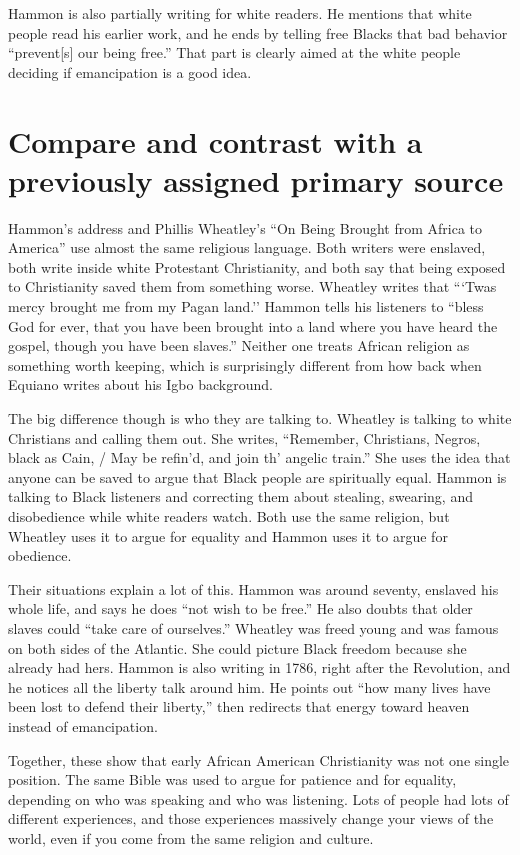 \documentclass[12pt]{article}
\begin{document}
Hammon is also partially writing for white readers. He mentions that white people read his earlier work, and he ends by telling free Blacks that bad behavior ``prevent[s] our being free.'' That part is clearly aimed at the white people deciding if emancipation is a good idea.

\section*{Compare and contrast with a previously assigned primary source}

Hammon's address and Phillis Wheatley's ``On Being Brought from Africa to America'' use almost the same religious language. Both writers were enslaved, both write inside white Protestant Christianity, and both say that being exposed to Christianity saved them from something worse. Wheatley writes that ```Twas mercy brought me from my Pagan land.'' Hammon tells his listeners to ``bless God for ever, that you have been brought into a land where you have heard the gospel, though you have been slaves.'' Neither one treats African religion as something worth keeping, which is surprisingly different from how back when Equiano writes about his Igbo background.

The big difference though is who they are talking to. Wheatley is talking to white Christians and calling them out. She writes, ``Remember, Christians, Negros, black as Cain, / May be refin'd, and join th' angelic train.'' She uses the idea that anyone can be saved to argue that Black people are spiritually equal. Hammon is talking to Black listeners and correcting them about stealing, swearing, and disobedience while white readers watch. Both use the same religion, but Wheatley uses it to argue for equality and Hammon uses it to argue for obedience.

Their situations explain a lot of this. Hammon was around seventy, enslaved his whole life, and says he does ``not wish to be free.'' He also doubts that older slaves could ``take care of ourselves.'' Wheatley was freed young and was famous on both sides of the Atlantic. She could picture Black freedom because she already had hers. Hammon is also writing in 1786, right after the Revolution, and he notices all the liberty talk around him. He points out ``how many lives have been lost to defend their liberty,'' then redirects that energy toward heaven instead of emancipation.

Together, these show that early African American Christianity was not one single position. The same Bible was used to argue for patience and for equality, depending on who was speaking and who was listening. Lots of people had lots of different experiences, and those experiences massively change your views of the world, even if you come from the same religion and culture.
\end{document}
